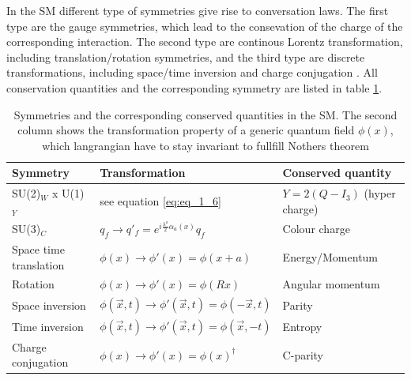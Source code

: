 In the \acs{SM} different type of symmetries give rise to conversation laws. The first type are the gauge symmetries, which lead to the consevation of the charge of the corresponding interaction. The second type are continous Lorentz transformation, including translation/rotation symmetries, and the third type are discrete transformations, including space/time inversion and charge conjugation \cite{Peskin}. All conservation quantities and the corresponding symmetry are listed in table \ref{tab:tab_1_1}.

\begin{table}[h]
	\centering
	\caption[Symmetries in the Standard Model]{Symmetries and the corresponding conserved quantities in the \acs{SM}. The second column shows the transformation property of a generic quantum field $\phi(x)$, which langrangian have to stay invariant to fullfill Nothers theorem}
	\label{tab:tab_1_1}

	\begin{tabular}{l|l|l}
		Symmetry					&Transformation										&Conserved quantity			\\ \hline
			
		SU(2)$_{W}$ x U(1)$_{Y}$			&see equation \ref{eq:eq_1_6}								&$Y = 2(Q - I_{3})$ (hyper charge)	\\ \hline
		
		SU(3)$_{C}$					&$q_{f} \rightarrow q'_{f} = e^{i\frac{\lambda^{a}}{2}\alpha_{a}(x)} q_{f}$		&Colour charge				\\ \hline \hline

		Space time translation 				&$\phi(x) \rightarrow \phi'(x) = \phi(x + a)$						&Energy/Momentum			\\ \hline

		Rotation					&$\phi(x) \rightarrow \phi'(x) = \phi(Rx)$						&Angular momentum			\\ \hline \hline

		Space inversion					&$\phi(\vec{x}, t) \rightarrow \phi'(\vec{x}, t) = \phi(-\vec{x}, t)$			&Parity					\\ \hline
		
		Time inversion					&$\phi(\vec{x}, t) \rightarrow \phi'(\vec{x}, t) = \phi(\vec{x}, -t)$	 		&Entropy				\\ \hline

		Charge conjugation				&$\phi(x) \rightarrow \phi'(x) = \phi(x)^{\dagger}$					&C-parity				
	\end{tabular}
\end{table}



